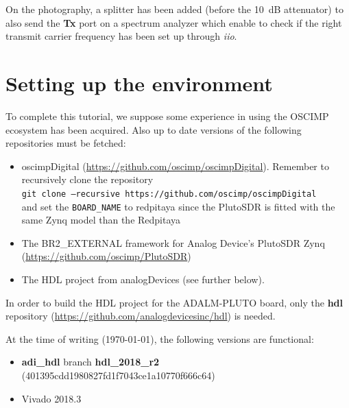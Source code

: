 \documentclass[12pt,oneside]{article}
\begin{document}
On the photography, a splitter has been added (before the 10~dB attenuator) to also send the 
{\bf Tx} port on a spectrum analyzer which enable to check if the right transmit carrier frequency 
has been set up through {\it iio}. 

\section{Setting up the environment}
To complete this tutorial, we suppose some experience in using the \mbox{OSCIMP} ecosystem has
been acquired. Also up to date versions of the following repositories must be fetched:
	\begin{itemize}
		\item oscimpDigital (\href{https://github.com/oscimp/oscimpDigital}{https://github.com/oscimp/oscimpDigital}). Remember to recursively clone the repository\\
{\tt git clone --recursive https://github.com/oscimp/oscimpDigital} \\
and set the {\tt BOARD\_NAME} to redpitaya since the PlutoSDR is fitted with the same Zynq model than
the Redpitaya
		\item The BR2\_EXTERNAL framework for Analog Device's PlutoSDR Zynq \\ (\href{https://github.com/oscimp/PlutoSDR}{https://github.com/oscimp/PlutoSDR})
		\item The HDL project from analogDevices (see further below).
	\end{itemize}

In order to build the HDL project for the ADALM-PLUTO board, only the {\bf{hdl}} repository
(\href{https://github.com/analogdevicesinc/hdl}{https://github.com/analogdevicesinc/hdl}) is needed.

\smallskip
At the time of writing (\today), the following versions are functional:
	\begin{itemize}
		\item {\bf{adi\_hdl}} branch {\bf{hdl\_2018\_r2}} (401395cdd1980827fd1f7043ce1a10770f666c64)
		\item Vivado 2018.3
	\end{itemize}
\end{document}

